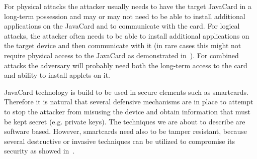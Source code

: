 \documentclass{../llncs/llncs}
\begin{document}
        For physical attacks the attacker usually needs to have the target JavaCard in a long-term possession and may or may not need to be able to install additional applications on the JavaCard and to communicate with the card. For logical attacks, the attacker often needs to be able to install additional applications on the target device and then communicate with it (in rare cases this might not require physical access to the JavaCard as demonstrated in~\cite{se:gemalto:part2}). For combined attacks the adversary will probably need both the long-term access to the card and ability to install applets on it.

        JavaCard technology is build to be used in secure elements such as smartcards. Therefore it is natural that several defensive mechanisms are in place to attempt to stop the attacker from misusing the device and obtain information that must be kept secret (e.g. private keys).
The techniques we are about to describe are software based. However, smartcards need also to be tamper resistant, because several destructive or invasive techniques can be utilized to compromise its security as showed in~\cite{kommerling}.

\end{document}
